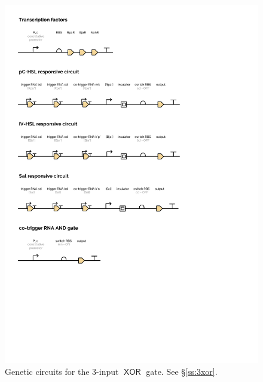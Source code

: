 \documentclass[12pt,notitlepage]{article}
\newcommand{\XOR}{\ensuremath{\mathop{\mathsf{XOR}}}\xspace}
\begin{document}
\begin{figure}[!p]
    \centering
    \includegraphics[height=(\textheight-2\baselineskip)]{xor_ribocomputing/xor_circuit_plot_2}
    \caption{Genetic circuits for the 3-input \XOR gate. See \S\ref{ss:3xor}.}
    \label{f:p_construct_xor}
\end{figure}

\end{document}

